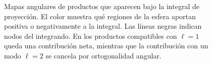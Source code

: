 \documentclass[11pt]{article}
\begin{document}
\begin{figure}[h]
\centering

\caption{Mapas angulares de productos que aparecen bajo la integral de proyección. El color muestra qué regiones de la esfera aportan positiva o negativamente a la integral. Las líneas negras indican nodos del integrando. En los productos compatibles con $\ell=1$ queda una contribución neta, mientras que la contribución con un modo $\ell=2$ se cancela por ortogonalidad angular.}
\end{figure}
\end{document}
